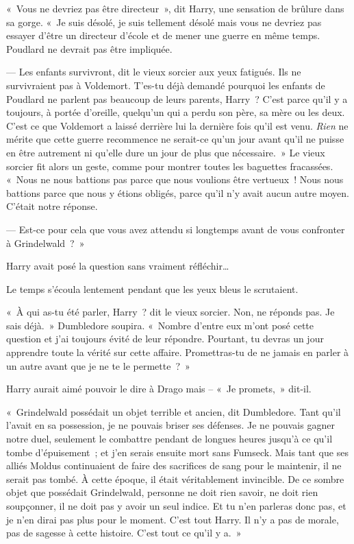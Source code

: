 «~Vous ne devriez pas être directeur~», dit Harry, une sensation de brûlure dans sa gorge.
«~Je suis désolé, je suis tellement désolé mais vous ne devriez pas essayer d'être un directeur d'école et de mener une guerre en même temps.
Poudlard ne devrait pas être impliquée.

--- Les enfants survivront, dit le vieux sorcier aux yeux fatigués.
Ils ne survivraient pas à Voldemort.
T'es-tu déjà demandé pourquoi les enfants de Poudlard ne parlent pas beaucoup de leurs parents, Harry~?
C'est parce qu'il y a toujours, à portée d'oreille, quelqu'un qui a perdu son père, sa mère ou les deux.
C'est ce que Voldemort a laissé derrière lui la dernière fois qu'il est venu.
\emph{Rien} ne mérite que cette guerre recommence ne serait-ce qu'un jour avant qu'il ne puisse en être autrement ni qu'elle dure un jour de plus que nécessaire.~»
Le vieux sorcier fit alors un geste, comme pour montrer toutes les baguettes fracassées.
«~Nous ne nous battions pas parce que nous voulions être vertueux~!
Nous nous battions parce que nous y étions obligés, parce qu'il n'y avait aucun autre moyen.
C'était notre réponse.

--- Est-ce pour cela que vous avez attendu si longtemps avant de vous confronter à Grindelwald~?~»

Harry avait posé la question sans vraiment réfléchir…

Le temps s'écoula lentement pendant que les yeux bleus le scrutaient.

«~À qui as-tu été parler, Harry~? dit le vieux sorcier.
Non, ne réponds pas.
Je sais déjà.~»
Dumbledore soupira.
«~Nombre d'entre eux m'ont posé cette question et j'ai toujours évité de leur répondre.
Pourtant, tu devras un jour apprendre toute la vérité sur cette affaire.
Promettras-tu de ne jamais en parler à un autre avant que je ne te le permette~?~»

Harry aurait aimé pouvoir le dire à Drago mais -- «~Je promets,~» dit-il.

«~Grindelwald possédait un objet terrible et ancien, dit Dumbledore.
Tant qu'il l'avait en sa possession, je ne pouvais briser ses défenses.
Je ne pouvais gagner notre duel, seulement le combattre pendant de longues heures jusqu'à ce qu'il tombe d'épuisement~; et j'en serais ensuite mort sans Fumseck.
Mais tant que ses alliés Moldus continuaient de faire des sacrifices de sang pour le maintenir, il ne serait pas tombé.
À cette époque, il était véritablement invincible.
De ce sombre objet que possédait Grindelwald, personne ne doit rien savoir, ne doit rien soupçonner, il ne doit pas y avoir un seul indice.
Et tu n'en parleras donc pas, et je n'en dirai pas plus pour le moment.
C'est tout Harry.
Il n'y a pas de morale, pas de sagesse à cette histoire.
C'est tout ce qu'il y a.~»

